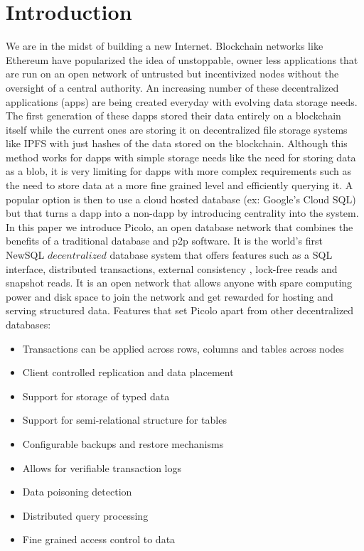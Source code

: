 \documentclass[preprint,10pt]{elsarticle}
\theoremstyle{definition}
\begin{document}
\section{Introduction}\label{Sect:Introduction}
We are in the midst of building a new Internet. Blockchain networks like Ethereum have popularized the idea of unstoppable, owner less applications that are run on an open network of untrusted but incentivized nodes without the oversight of a central authority. An increasing number of these decentralized applications (\DJ apps) are being created everyday with evolving data storage needs. The first generation of these dapps stored their data entirely on a blockchain itself while the current ones are storing it on decentralized file storage systems like IPFS with just hashes of the data stored on the blockchain. Although this method works for dapps with simple storage needs like the need for storing data as a blob, it is very limiting for dapps with more complex requirements such as the need to store data at a more fine grained level and efficiently querying it. A popular option is then to use a cloud hosted database (ex: Google’s Cloud SQL) but that turns a dapp into a non-dapp by introducing centrality into the system. \newline\newline
In this paper we introduce \textsf{Picolo}, an open database network that combines the benefits of a traditional database and p2p software. It is the world's first NewSQL $decentralized$ database system that offers features such as a SQL interface, distributed transactions, external consistency \cite{External_Consistency}, lock-free reads and snapshot reads. It is an open network that allows anyone with spare computing power and disk space to join the network and get rewarded for hosting and serving structured data.
\newline\newline
Features that set \textsf{Picolo} apart from other decentralized databases:
\begin{itemize}
	\item Transactions can be applied across rows, columns and tables across nodes
	\item Client controlled replication and data placement
	\item Support for storage of typed data
	\item Support for semi-relational structure for tables
	\item Configurable backups and restore mechanisms
	\item Allows for verifiable transaction logs
	\item Data poisoning detection
	\item Distributed query processing
	\item Fine grained access control to data
	\newline
\end{itemize}
\end{document}
